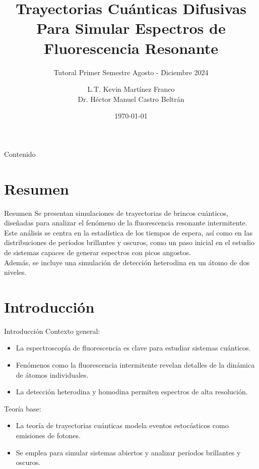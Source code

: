 \documentclass[11pt]{beamer}
\title[Trayectorias Cuánticas]{Trayectorias Cuánticas Difusivas Para Simular
Espectros de Fluorescencia Resonante}
\author[Kevin Martínez Franco]{
    L.T. Kevin Martínez Franco \\ 
    Dr. Héctor Manuel Castro Beltrán
}
\institute[CIICAP]{
	\inst{1}
		Universidad Autónoma del Estado de Morelos\\
		\vspace{2mm}
	\inst{2}
            Instituto De Investigación En Ciencias Básicas y Aplicadas
		 
}
\date{\today}
\subtitle{Tutoral Primer Semestre Agosto - Diciembre 2024 }
\begin{document}
        \begin{frame}
		\maketitle
	\end{frame}


        \begin{frame}{Contenido}
		\tableofcontents
	\end{frame} 

\section{Resumen}
\begin{frame}{Resumen}
\justifying
Se presentan simulaciones de trayectorias de brincos cuánticos, diseñadas para analizar el fenómeno de la fluorescencia resonante intermitente. Este análisis se centra en la estadística de los tiempos de espera, así como en las distribuciones de períodos brillantes y oscuros, como un paso inicial en el estudio de sistemas capaces de generar espectros con picos angostos.
\\
Además, se incluye una simulación de detección heterodina en un átomo de dos niveles.

\end{frame}




\section{Introducción}
\begin{frame}{Introducción}
\justifying
Contexto general:
\begin{itemize}
    \item La espectroscopía de fluorescencia es clave para estudiar sistemas cuánticos.
    \item Fenómenos como la fluorescencia intermitente revelan detalles de la dinámica de átomos individuales.
    \item La detección heterodina y homodina permiten espectros de alta resolución.
\end{itemize}
Teoría base: 
\begin{itemize}
    \item La teoría de trayectorias cuánticas modela eventos estocásticos como emisiones de fotones.
    \item Se emplea para simular sistemas abiertos y analizar períodos brillantes y oscuros.
\end{itemize}
\end{frame}
\end{document}
